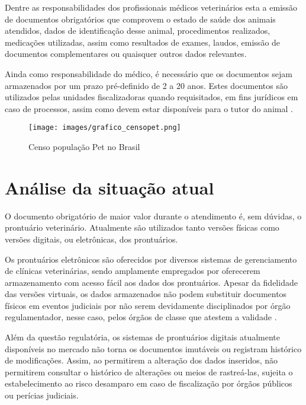 \documentclass[
    12pt,               %
    openright,          %
    oneside,
    a4paper,            %
    MODELO,             %
    TODO,               %
    english,            %
    brazil              %
    ]{ifsp-spo-inf-ctds}
\begin{document}
    Dentre as responsabilidades dos profissionais médicos veterinários esta a emissão de documentos obrigatórios que comprovem o estado de saúde dos animais atendidos, dados de identificação desse animal, procedimentos realizados, medicações utilizadas, assim como resultados de exames, laudos, emissão de documentos complementares ou quaisquer outros dados relevantes.
    
    Ainda como responsabilidade do médico, é necessário que os documentos sejam armazenados por um prazo pré-definido de 2 a 20 anos. Estes documentos são utilizados pelas unidades fiscalizadoras quando requisitados, em fins jurídicos em caso de processos, assim como devem estar disponíveis para o tutor do animal \cite{doc_obrig}.
     
     \begin{figure}[H]
        \centering
        \texttt{[image: images/grafico\_censopet.png]}
        \caption{Censo população Pet no Brasil\cite{ibge2013, ibge2018, pet2021}}
        \label{fig:grafico pet}
    \end{figure}

    \section{Análise da situação atual}
    
    O documento obrigatório de maior valor durante o atendimento é, sem dúvidas, o prontuário veterinário. Atualmente são utilizados tanto versões físicas como versões digitais, ou eletrônicas, dos prontuários.
    
    Os prontuários eletrônicos são oferecidos por diversos sistemas de gerenciamento de clínicas veterinárias, sendo amplamente empregados por oferecerem armazenamento com acesso fácil aos dados dos prontuários. Apesar da fidelidade das versões virtuais, os dados armazenados não podem substituir documentos físicos em eventos judiciais por não serem devidamente disciplinados por órgão regulamentador, nesse caso, pelos órgãos de classe que atestem a validade \cite{pe_dig} \cite{prontuario}.

    Além da questão regulatória, os sistemas de prontuários digitais atualmente disponíveis no mercado não torna os documentos imutáveis ou registram histórico de modificações. Assim, ao permitirem a alteração dos dados inseridos, não permitirem consultar o histórico de alterações ou meios de rastreá-las, sujeita o estabelecimento ao risco desamparo em caso de fiscalização por órgãos públicos ou perícias judiciais.
    
\end{document}
